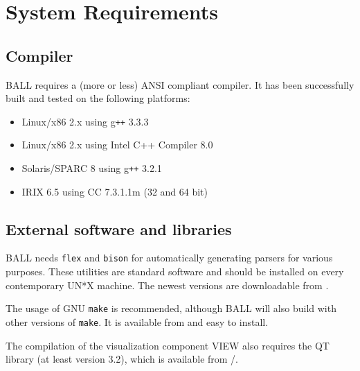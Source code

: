 \section{System Requirements}

\subsection{Compiler}
  BALL requires a (more or less) ANSI compliant \CPP compiler.
  It has been successfully built and tested on the following platforms:
	\begin{itemize}	
   	\item Linux/x86 2.x using g{\tt ++} 3.3.3
   	\item Linux/x86 2.x using Intel C++ Compiler 8.0
   	\item Solaris/SPARC 8 using g{\tt ++} 3.2.1
   	\item IRIX 6.5 using CC 7.3.1.1m (32 and 64 bit)
 	\end{itemize}

\subsection{External software and libraries}
BALL needs {\tt flex} and {\tt bison} for automatically generating parsers
for various purposes. These utilities are standard software and should be
installed on every contemporary UN*X machine. The newest versions are
downloadable from .

The usage of GNU {\tt make} is recommended, although BALL will also build with
other versions of {\tt make}. It is available from 
and easy to install.

The compilation of the visualization component VIEW also requires
the QT library (at least version 3.2), which is available from
/.

